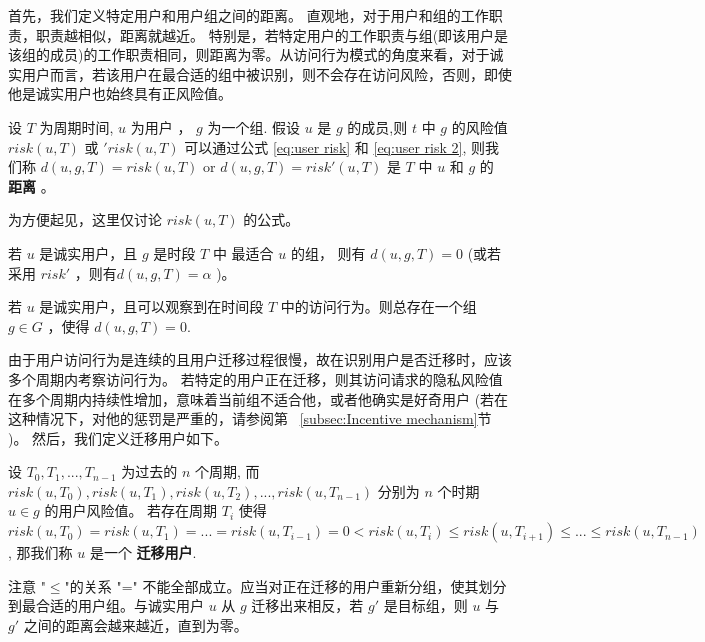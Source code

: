首先，我们定义特定用户和用户组之间的距离。 直观地，对于用户和组的工作职责，职责越相似，距离就越近。 特别是，若特定用户的工作职责与组(即该用户是该组的成员)的工作职责相同，则距离为零。从访问行为模式的角度来看，对于诚实用户而言，若该用户在最合适的组中被识别，则不会存在访问风险，否则，即使他是诚实用户也始终具有正风险值。

\begin{definition}%
	\label{user-group distance}
	设 $T$ 为周期时间, $u$ 为用户 ， $g$ 为一个组. 假设 $u$ 是 $g$ 的成员,则 $t$ 中 $g$ 的风险值 $risk(u,T)$ 或 $'risk(u,T)$ 可以通过公式 \ref{eq:user risk} 和 \ref{eq:user risk 2}, 则我们称 $d(u,g,T)=risk(u,T)$ or $d(u,g,T)=risk'(u,T)$ 是 $T$ 中 $u$ 和 $g$ 的 \textbf{距离} 。
\end{definition}

为方便起见，这里仅讨论 $risk(u,T)$ 的公式。

\begin{claim}[用户组距离]
	若 $u$ 是诚实用户，且 $g$ 是时段 $T$ 中 最适合 $u$ 的组， 则有 $d(u,g,T)=0$ (或若采用 $risk'$ ，则有$d(u,g,T)=\alpha$ )。
\end{claim}

\begin{claim}
	若 $u$ 是诚实用户，且可以观察到在时间段 $T$ 中的访问行为。则总存在一个组 $g \in G$ ，使得 $d(u,g,T)=0$.
\end{claim}

由于用户访问行为是连续的且用户迁移过程很慢，故在识别用户是否迁移时，应该多个周期内考察访问行为。 若特定的用户正在迁移，则其访问请求的隐私风险值在多个周期内持续性增加，意味着当前组不适合他，或者他确实是好奇用户 (若在这种情况下，对他的惩罚是严重的，请参阅第 ~\ref{subsec:Incentive mechanism}节 )。 然后，我们定义迁移用户如下。

\begin{definition}%
	\label{def:migrating user}
	设 $T_0,T_1,...,T_{n-1}$ 为过去的 $n$ 个周期, 而 $risk(u,T_0),risk(u,T_1),risk(u,T_2),..., risk(u,T_{n-1})$ 分别为 $n$ 个时期 $u\in g$ 的用户风险值。 若存在周期 $T_i$ 使得 $risk(u,T_0) = risk(u,T_1) = ... = risk(u,T_{i-1}) =0  < risk(u,T_{i}) \leq risk(u,T_{i+1}) \leq ... \leq risk(u,T_{n-1})$, 那我们称 $u$ 是一个 \textbf{迁移用户}.
\end{definition}

注意 "$\leq$"的关系 "=" 不能全部成立。应当对正在迁移的用户重新分组，使其划分到最合适的用户组。与诚实用户 $u$ 从 $g$ 迁移出来相反，若 $g'$ 是目标组，则 $u$ 与 $g'$ 之间的距离会越来越近，直到为零。

